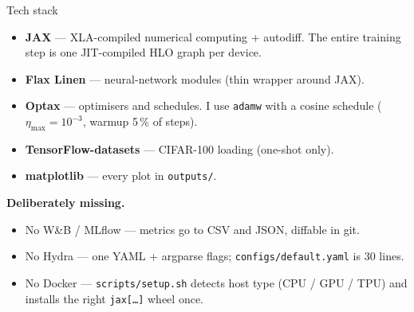 \documentclass[aspectratio=169,10pt]{beamer}
\begin{document}
\begin{frame}{Tech stack}
  \begin{itemize}
    \item \textbf{JAX} — XLA-compiled numerical computing + autodiff. The entire training
          step is one JIT-compiled HLO graph per device.
    \item \textbf{Flax Linen} — neural-network modules (thin wrapper around JAX).
    \item \textbf{Optax} — optimisers and schedules. I use \texttt{adamw} with a cosine
          schedule ($\eta_{\max}=10^{-3}$, warmup 5\,\% of steps).
    \item \textbf{TensorFlow-datasets} — CIFAR-100 loading (one-shot only).
    \item \textbf{matplotlib} — every plot in \texttt{outputs/}.
  \end{itemize}

  \vspace{0.4em}
  \textbf{Deliberately missing.}
  \begin{itemize}\small
    \item No W\&B / MLflow — metrics go to CSV and JSON, diffable in git.
    \item No Hydra — one YAML + argparse flags; \texttt{configs/default.yaml} is 30 lines.
    \item No Docker — \texttt{scripts/setup.sh} detects host type (CPU / GPU / TPU) and
          installs the right \texttt{jax[\ldots]} wheel once.
  \end{itemize}
\end{frame}
\end{document}
